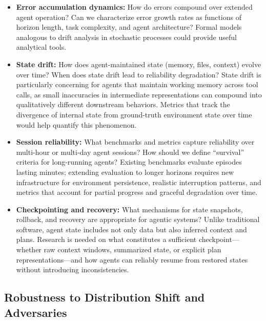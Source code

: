 \documentclass[11pt]{article}
\begin{document}
\begin{itemize}[leftmargin=*]
    \item \textbf{Error accumulation dynamics:} How do errors compound over extended agent operation?
    Can we characterize error growth rates as functions of horizon length, task complexity, and agent architecture? 
    Formal models analogous to drift analysis in stochastic processes could provide useful analytical tools.

    \item \textbf{State drift:} How does agent-maintained state (memory, files, context) evolve over time?
    When does state drift lead to reliability degradation?
    State drift is particularly concerning for agents that maintain working memory across tool calls, as small inaccuracies in intermediate representations can compound into qualitatively different downstream behaviors.
    Metrics that track the divergence of internal state from ground-truth environment state over time would help quantify this phenomenon.

    \item \textbf{Session reliability:} What benchmarks and metrics capture reliability over multi-hour or multi-day agent sessions?
    How should we define ``survival'' criteria for long-running agents?
    Existing benchmarks evaluate episodes lasting minutes; extending evaluation to longer horizons requires new infrastructure for environment persistence, realistic interruption patterns, and metrics that account for partial progress and graceful degradation over time.

    \item \textbf{Checkpointing and recovery:} What mechanisms for state snapshots, rollback, and recovery are appropriate for agentic systems?
    Unlike traditional software, agent state includes not only data but also inferred context and plans.
    Research is needed on what constitutes a sufficient checkpoint---whether raw context windows, summarized state, or explicit plan representations---and how agents can reliably resume from restored states without introducing inconsistencies.
\end{itemize}

\subsection{Robustness to Distribution Shift and Adversaries}
\end{document}
